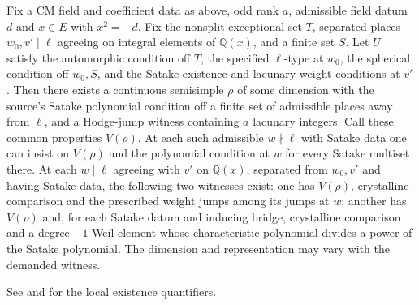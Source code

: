 
\begin{formalstatement}\label{sub:B02}
Fix a CM field and coefficient data as above, odd rank $a$, admissible field
datum $d$ and $x\in E$ with $x^2=-d$. Fix the nonsplit exceptional set $T$,
separated places $w_0,v'\mid\ell$ agreeing on integral elements of
$\mathbb Q(x)$, and a finite set $S$. Let $U$ satisfy the automorphic
condition off $T$, the specified $\ell$-type at $w_0$, the spherical condition
off $w_0,S$, and the Satake-existence and lacunary-weight conditions at $v'$.
Then there exists a continuous semisimple $\rho$ of some dimension with
the source's Satake polynomial condition off a finite set of admissible
places away from $\ell$, and a Hodge-jump witness containing $a$ lacunary
integers. Call these common properties $V(\rho)$.
At each such admissible $w\nmid\ell$ with Satake data one can insist on
$V(\rho)$ and the polynomial condition at $w$ for every Satake multiset
there. At each $w\mid\ell$ agreeing with $v'$ on $\mathbb Q(x)$, separated
from $w_0,v'$ and having Satake data, the following two witnesses exist:
one has $V(\rho)$, crystalline comparison and the prescribed weight jumps
among its jumps at $w$; another has $V(\rho)$ and, for each Satake datum
and inducing bridge, crystalline comparison and a degree $-1$ Weil element
whose characteristic polynomial divides a power of the Satake polynomial.
The dimension and representation may vary with the demanded witness.
\end{formalstatement}
See  and
 for the local
existence quantifiers.
